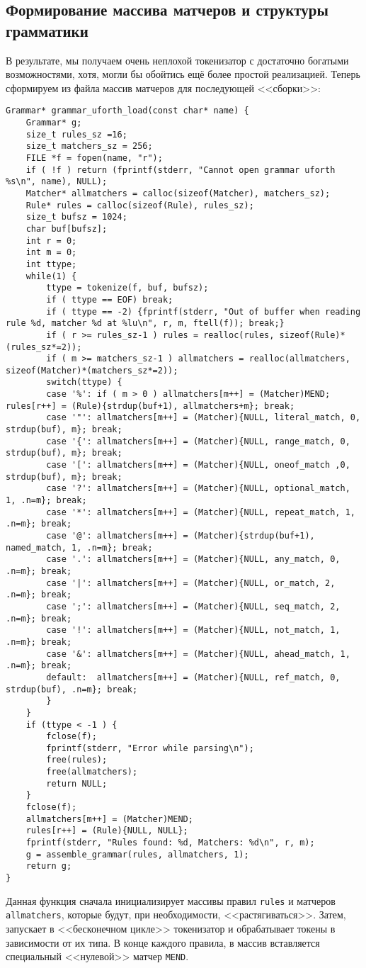 \documentclass[10pt]{report}
\begin{document}
\subsection{Формирование массива матчеров и структуры грамматики}
В результате, мы получаем очень неплохой токенизатор с достаточно богатыми возможностями, хотя, могли бы обойтись ещё более простой реализацией.
Теперь сформируем из файла массив матчеров для последующей <<сборки>>:
\begin{lstlisting}[firstnumber=34,caption=uforth.c -- Загрузка ФОРТ-программы и её интерпретация]
Grammar* grammar_uforth_load(const char* name) {
	Grammar* g;
	size_t rules_sz =16;
	size_t matchers_sz = 256;
	FILE *f = fopen(name, "r");
	if ( !f ) return (fprintf(stderr, "Cannot open grammar uforth %s\n", name), NULL);
	Matcher* allmatchers = calloc(sizeof(Matcher), matchers_sz); 
	Rule* rules = calloc(sizeof(Rule), rules_sz);
	size_t bufsz = 1024;
	char buf[bufsz];
	int r = 0;
	int m = 0;
	int ttype;
	while(1) {
		ttype = tokenize(f, buf, bufsz);
		if ( ttype == EOF) break;
		if ( ttype == -2) {fprintf(stderr, "Out of buffer when reading rule %d, matcher %d at %lu\n", r, m, ftell(f)); break;}
		if ( r >= rules_sz-1 ) rules = realloc(rules, sizeof(Rule)*(rules_sz*=2));
		if ( m >= matchers_sz-1 ) allmatchers = realloc(allmatchers, sizeof(Matcher)*(matchers_sz*=2));
		switch(ttype) {
		case '%': if ( m > 0 ) allmatchers[m++] = (Matcher)MEND; rules[r++] = (Rule){strdup(buf+1), allmatchers+m}; break;
		case '"': allmatchers[m++] = (Matcher){NULL, literal_match, 0, strdup(buf), m}; break;
		case '{': allmatchers[m++] = (Matcher){NULL, range_match, 0, strdup(buf), m}; break;
		case '[': allmatchers[m++] = (Matcher){NULL, oneof_match ,0, strdup(buf), m}; break;
		case '?': allmatchers[m++] = (Matcher){NULL, optional_match, 1, .n=m}; break;
		case '*': allmatchers[m++] = (Matcher){NULL, repeat_match, 1, .n=m}; break;
		case '@': allmatchers[m++] = (Matcher){strdup(buf+1), named_match, 1, .n=m}; break;
		case '.': allmatchers[m++] = (Matcher){NULL, any_match, 0, .n=m}; break;
		case '|': allmatchers[m++] = (Matcher){NULL, or_match, 2, .n=m}; break;
		case ';': allmatchers[m++] = (Matcher){NULL, seq_match, 2, .n=m}; break;
		case '!': allmatchers[m++] = (Matcher){NULL, not_match, 1, .n=m}; break;
		case '&': allmatchers[m++] = (Matcher){NULL, ahead_match, 1, .n=m}; break;
		default:  allmatchers[m++] = (Matcher){NULL, ref_match, 0, strdup(buf), .n=m}; break;
		}
	}
	if (ttype < -1 ) {
		fclose(f);
		fprintf(stderr, "Error while parsing\n");
		free(rules);
		free(allmatchers);
		return NULL;
	}
	fclose(f);
	allmatchers[m++] = (Matcher)MEND;
	rules[r++] = (Rule){NULL, NULL};
	fprintf(stderr, "Rules found: %d, Matchers: %d\n", r, m);
	g = assemble_grammar(rules, allmatchers, 1);
	return g;
}
\end{lstlisting}
Данная функция сначала инициализирует массивы правил {\tt rules}  и матчеров {\tt allmatchers}, которые будут, при необходимости, <<растягиваться>>. 
Затем, запускает в <<бесконечном цикле>> токенизатор и обрабатывает токены в зависимости от их типа. 
В конце каждого правила, в массив вставляется специальный <<нулевой>> матчер {\tt MEND}.
\end{document}
